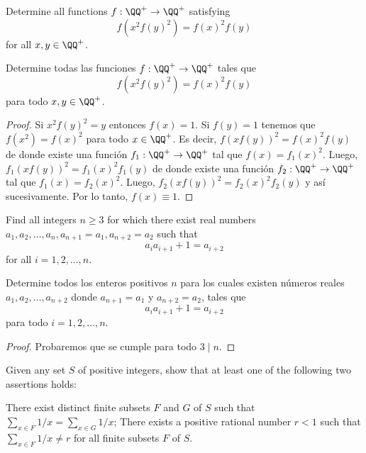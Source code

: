 \begin{probEG}
	Determine all functions $f:\QQ^+\to\QQ^+$ satisfying
	\[f(x^2f(y)^2)=f(x)^2f(y)\]
	for all $x,y\in\QQ^+$.
	\begin{probSP}
		Determine todas las funciones $f:\QQ^+\to\QQ^+$ tales que
		\[f(x^2f(y)^2)=f(x)^2f(y)\]
		para todo $x,y\in\QQ^+$.
	\end{probSP}
\end{probEG}

\begin{proof}
	Si $x^2f(y)^2=y$ entonces $f(x)=1$. Si $f(y)=1$ tenemos que $f(x^2)=f(x)^2$ para todo $x\in\QQ^+$. Es decir, $f(xf(y))^2=f(x)^2f(y)$ de donde existe una función $f_1:\QQ^+\to\QQ^+$ tal que $f(x)=f_1(x)^2$. Luego, $f_1(xf(y))^2=f_1(x)^2f_1(y)$ de donde existe una función $f_2:\QQ^+\to\QQ^+$ tal que $f_1(x)=f_2(x)^2$. Luego, $f_2(xf(y))^2=f_2(x)^2f_2(y)$ y así sucesivamente. Por lo tanto, $f(x)\equiv 1$.
\end{proof}

\begin{probMR}
	Find all integers $n\ge 3$ for which there exist real numbers $a_1,a_2,\dots,a_n,a_{n+1}=a_1,a_{n+2}=a_2$ such that
	\[a_ia_{i+1}+1=a_{i+2}\]
	for all $i=1,2,\dots,n$.
	\begin{probSP}
		Determine todos los enteros positivos $n$ para los cuales existen números reales $a_1,a_2,\dots,a_{n+2}$ donde $a_{n+1}=a_1$ y $a_{n+2}=a_2$, tales que
		\[a_ia_{i+1}+1=a_{i+2}\]
		para todo $i=1,2,\dots,n$.
	\end{probSP}
\end{probMR}

\begin{proof}
	Probaremos que se cumple para todo $3\mid n$.
\end{proof}

\begin{probMB}
	Given any set $S$ of positive integers, show that at least one of the following two assertions holds:
	\begin{enumerate}[(1)]
		\ii \label{enumi:finite_subsets} There exist distinct finite subsets $F$ and $G$ of $S$ such that $\sum_{x\in F}1/x=\sum_{x\in G}1/x$;
		\ii \label{enumi:rational_number} There exists a positive rational number $r<1$ such that $\sum_{x\in F}1/x\ne r$ for all finite subsets $F$ of $S$.
	\end{enumerate}
\end{probMB}

